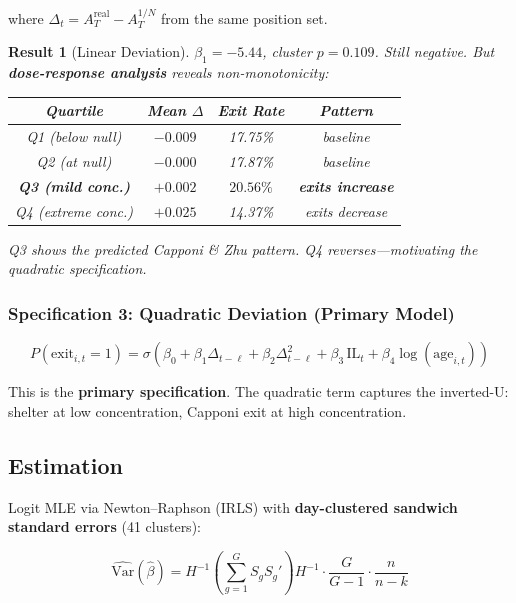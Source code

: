 \documentclass[11pt,a4paper]{article}
\newtheorem{result}{Result}
\begin{document}
where $\Delta_{t} = A_T^{\text{real}} - A_T^{1/N}$ from the same position
set.

\begin{result}[Linear Deviation]\label{res:deviation}
$\beta_1 = -5.44$, cluster $p = 0.109$. Still negative. But
\textbf{dose-response analysis} reveals non-monotonicity:

\begin{center}
\begin{tabular}{cccc}
\toprule
Quartile & Mean $\Delta$ & Exit Rate & Pattern \\
\midrule
Q1 (below null) & $-0.009$ & 17.75\% & baseline \\
Q2 (at null) & $-0.000$ & 17.87\% & baseline \\
\textbf{Q3 (mild conc.)} & $\mathbf{+0.002}$ & $\mathbf{20.56\%}$ &
  \textbf{exits increase} \\
Q4 (extreme conc.) & $+0.025$ & 14.37\% & exits decrease \\
\bottomrule
\end{tabular}
\end{center}

Q3 shows the predicted Capponi \& Zhu pattern. Q4 reverses---motivating
the quadratic specification.
\end{result}

\subsubsection{Specification 3: Quadratic Deviation (Primary Model)}

\begin{equation}\label{eq:quadratic}
\boxed{
  P(\text{exit}_{i,t} = 1) = \sigma\!\left(
    \beta_0 + \beta_1 \Delta_{t-\ell} + \beta_2 \Delta_{t-\ell}^2
    + \beta_3 \, \text{IL}_t + \beta_4 \log(\text{age}_{i,t})
  \right)
}
\end{equation}

This is the \textbf{primary specification}. The quadratic term captures the
inverted-U: shelter at low concentration, Capponi exit at high
concentration.


\subsection{Estimation}

Logit MLE via Newton--Raphson (IRLS) with \textbf{day-clustered sandwich
standard errors} (41 clusters):

\begin{equation}\label{eq:cluster-se}
  \widehat{\text{Var}}(\hat\beta) = H^{-1}
  \left(\sum_{g=1}^{G} S_g S_g'\right)
  H^{-1} \cdot \frac{G}{G-1} \cdot \frac{n}{n-k}
\end{equation}
\end{document}
